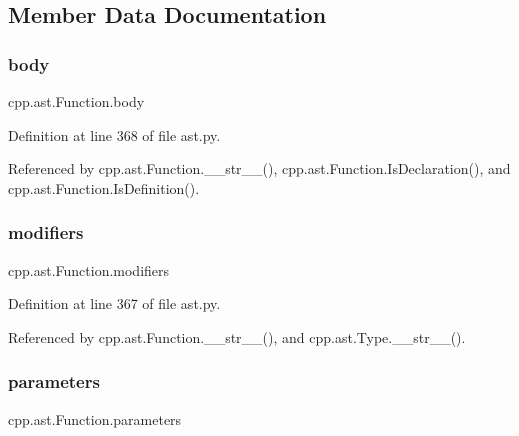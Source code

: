 \subsection{Member Data Documentation}
\mbox{\label{classcpp_1_1ast_1_1Function_a8e25e5016b23b38e32acf2df529c0650}} 
\subsubsection{\texorpdfstring{body}{body}}
{\footnotesize\ttfamily cpp.\+ast.\+Function.\+body}



Definition at line 368 of file ast.\+py.



Referenced by cpp.\+ast.\+Function.\+\_\+\+\_\+str\+\_\+\+\_\+(), cpp.\+ast.\+Function.\+Is\+Declaration(), and cpp.\+ast.\+Function.\+Is\+Definition().

\mbox{\label{classcpp_1_1ast_1_1Function_ad30eed435f1ff9ff34ade9cc0d7be121}} 
\subsubsection{\texorpdfstring{modifiers}{modifiers}}
{\footnotesize\ttfamily cpp.\+ast.\+Function.\+modifiers}



Definition at line 367 of file ast.\+py.



Referenced by cpp.\+ast.\+Function.\+\_\+\+\_\+str\+\_\+\+\_\+(), and cpp.\+ast.\+Type.\+\_\+\+\_\+str\+\_\+\+\_\+().

\mbox{\label{classcpp_1_1ast_1_1Function_a0e61ef47af9cf2fd4402dbd8cab631ef}} 
\subsubsection{\texorpdfstring{parameters}{parameters}}
{\footnotesize\ttfamily cpp.\+ast.\+Function.\+parameters}



